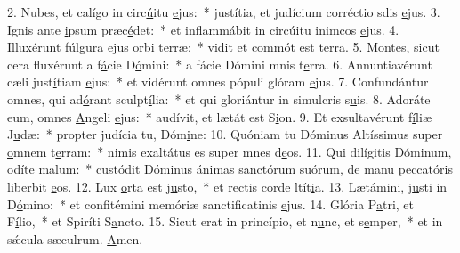 2. Nubes, et calígo in circ\uline{ú}itu \uline{e}jus:~* justítia, et judícium corréctio sdis \uline{e}jus.
3. Ignis ante \uline{i}psum præc\uline{é}det:~* et inflammábit in circúitu inimcos \uline{e}jus.
4. Illuxérunt fúlgura ejus \uline{o}rbi t\uline{e}rræ:~* vidit et commót est t\uline{e}rra.
5. Montes, sicut cera fluxérunt a f\uline{á}cie D\uline{ó}mini:~* a fácie Dómini mnis t\uline{e}rra.
6. Annuntiavérunt cæli just\uline{í}tiam \uline{e}jus:~* et vidérunt omnes pópuli glóram \uline{e}jus.
7. Confundántur omnes, qui ad\uline{ó}rant sculpt\uline{í}lia:~* et qui gloriántur in simulcris s\uline{u}is.
8. Adoráte eum, omnes \uline{A}ngeli \uline{e}jus:~* audívit, et lætát est S\uline{i}on.
9. Et exsultavérunt f\uline{í}liæ J\uline{u}dæ:~* propter judícia tu, Dóm\uline{i}ne:
10. Quóniam tu Dóminus Altíssimus super \uline{o}mnem t\uline{e}rram:~* nimis exaltátus es super mnes d\uline{e}os.
11. Qui dilígitis Dóminum, od\uline{í}te m\uline{a}lum:~* custódit Dóminus ánimas sanctórum suórum, de manu peccatóris liberbit \uline{e}os.
12. Lux \uline{o}rta est j\uline{u}sto,~* et rectis corde ltít\uline{i}a.
13. Lætámini, j\uline{u}sti in D\uline{ó}mino:~* et confitémini memóriæ sanctificatinis \uline{e}jus.
14. Glória P\uline{a}tri, et F\uline{í}lio,~* et Spiríti S\uline{a}ncto.
15. Sicut erat in princípio, et n\uline{u}nc, et s\uline{e}mper,~* et in sǽcula sæculrum. \uline{A}men.
